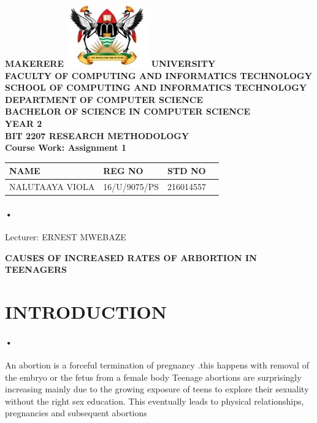 \documentclass[12pt]{article}
\begin{document}
\begin{Huge}
\begin{center}
\begin{normalsize}
\textbf{MAKERERE \includegraphics[scale=0.5]{logo} UNIVERSITY }\\


\textbf{FACULTY OF COMPUTING AND INFORMATICS TECHNOLOGY} \\
\textbf{SCHOOL OF COMPUTING AND INFORMATICS TECHNOLOGY} \\
\textbf{DEPARTMENT OF COMPUTER SCIENCE} \\
\textbf{BACHELOR OF SCIENCE IN COMPUTER SCIENCE} \\
\textbf{YEAR 2} \\
\textbf{BIT 2207 RESEARCH METHODOLOGY} \\
\textbf{Course Work: Assignment 1}\\
\end{normalsize}
\end{center}
\end{Huge}

\begin{center}
\begin{tabular}{|l|l|l|c|}
\hline NAME  & REG NO & STD NO \\\hline
NALUTAAYA VIOLA& 16/U/9075/PS & 216014557 \\\hline
\end{tabular}
\paragraph{•}
Lecturer: ERNEST MWEBAZE \\
\end{center}

\newpage

\begin{center}
\textbf{CAUSES OF INCREASED RATES OF ARBORTION IN TEENAGERS}\\
\end{center}

\section{INTRODUCTION}
\paragraph{•}
An abortion is a forceful termination of pregnancy .this happens with removal of the embryo or the fetus from a female body
Teenage abortions are surprisingly increasing mainly due to the growing exposure of teens to explore their sexuality without the right sex education. This eventually leads to physical relationships, pregnancies and subsequent abortions 
\end{document}
